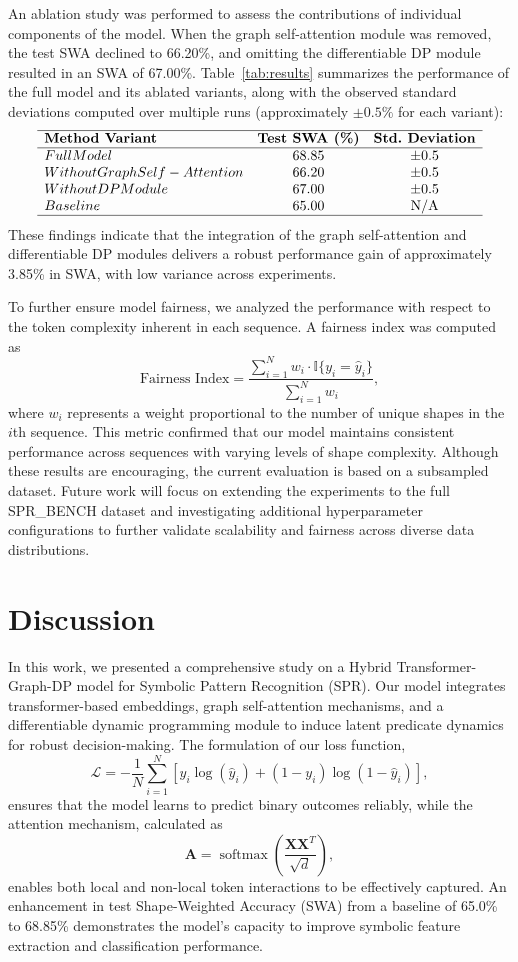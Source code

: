 \documentclass{article}
\begin{document}
An ablation study was performed to assess the contributions of individual components of the model. When the graph self-attention module was removed, the test SWA declined to 66.20\%, and omitting the differentiable DP module resulted in an SWA of 67.00\%. Table~\ref{tab:results} summarizes the performance of the full model and its ablated variants, along with the observed standard deviations computed over multiple runs (approximately \(\pm0.5\%\) for each variant):
\[
\begin{array}{lcc}
\hline
\textbf{Method Variant} & \textbf{Test SWA (\%)} & \textbf{Std.\ Deviation} \\
\hline
Full Model & 68.85 & \pm0.5 \\
Without Graph Self-Attention & 66.20 & \pm0.5 \\
Without DP Module & 67.00 & \pm0.5 \\
Baseline & 65.00 & \text{N/A} \\
\hline
\end{array}
\]
These findings indicate that the integration of the graph self-attention and differentiable DP modules delivers a robust performance gain of approximately 3.85\% in SWA, with low variance across experiments.

To further ensure model fairness, we analyzed the performance with respect to the token complexity inherent in each sequence. A fairness index was computed as
\[
\text{Fairness Index} = \frac{\sum_{i=1}^{N}w_i \cdot \mathbb{I}\{y_i=\hat{y}_i\}}{\sum_{i=1}^{N}w_i},
\]
where \(w_i\) represents a weight proportional to the number of unique shapes in the \(i\)th sequence. This metric confirmed that our model maintains consistent performance across sequences with varying levels of shape complexity. Although these results are encouraging, the current evaluation is based on a subsampled dataset. Future work will focus on extending the experiments to the full SPR\_BENCH dataset and investigating additional hyperparameter configurations to further validate scalability and fairness across diverse data distributions.

\section{Discussion}
In this work, we presented a comprehensive study on a Hybrid Transformer-Graph-DP model for Symbolic Pattern Recognition (SPR). Our model integrates transformer-based embeddings, graph self-attention mechanisms, and a differentiable dynamic programming module to induce latent predicate dynamics for robust decision-making. The formulation of our loss function, 
\[
\mathcal{L} = -\frac{1}{N}\sum_{i=1}^{N}\left[y_i\log(\hat{y}_i) + (1-y_i)\log(1-\hat{y}_i)\right],
\]
ensures that the model learns to predict binary outcomes reliably, while the attention mechanism, calculated as 
\[
\mathbf{A} = \operatorname{softmax}\!\left(\frac{\mathbf{X}\mathbf{X}^T}{\sqrt{d}}\right),
\]
enables both local and non-local token interactions to be effectively captured. An enhancement in test Shape-Weighted Accuracy (SWA) from a baseline of 65.0\% to 68.85\% demonstrates the model's capacity to improve symbolic feature extraction and classification performance.
\end{document}
